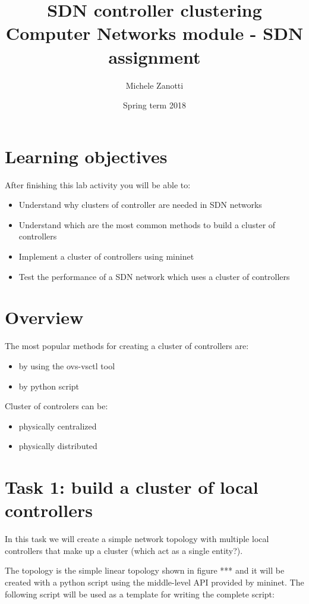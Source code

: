 \documentclass[12pt, a4paper]{article}
\title{SDN controller clustering \\ \large Computer Networks module - SDN assignment}
\author{Michele Zanotti}
\date{Spring term 2018}
\begin{document}
\begin{titlepage}
\maketitle
\end{titlepage}

\section*{Learning objectives}
After finishing this lab activity you will be able to:
\begin{itemize}
  \item Understand why clusters of controller are needed in SDN networks
  \item Understand which are the most common methods to build a cluster of controllers
  \item Implement a cluster of controllers using mininet
  \item Test the performance of a SDN network which uses a cluster of controllers
\end{itemize}


\section*{Overview}
The most popular methods for creating a cluster of controllers are:
\begin{itemize}
  \item by using the ovs-vsctl tool
  \item by python script
\end{itemize}
Cluster of controlers can be:
\begin{itemize}
  \item physically centralized
  \item physically distributed
\end{itemize}


\section{Task 1: build a cluster of local controllers}
In this task we will create a simple network topology with multiple local controllers
that make up a cluster (which act as a single entity?).

The topology is the simple linear topology shown in figure *** and it will be
created with a python script using the middle-level API provided by mininet. The following
script will be used as a template for writing the complete script:
\end{document}
